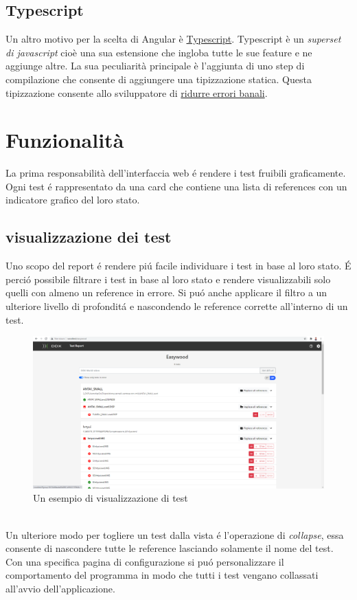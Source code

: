         \subsection{Typescript}
            Un altro motivo per la scelta di Angular è \href{https://www.typescriptlang.org}{Typescript}.
            Typescript è un \textit{superset di javascript} cioè una sua estensione che ingloba tutte le sue feature e ne aggiunge altre.
            La sua peculiarità principale è l'aggiunta di uno step di compilazione che consente di aggiungere una tipizzazione statica.
            Questa tipizzazione consente allo sviluppatore di
            \href{https://www.quora.com/Why-is-type-checking-important-in-programming-languages-and-how-should-one-choose-between-dynamically-and-statically-typed-languages}{ridurre errori banali}.
    \section{Funzionalità}
        La prima responsabilità dell'interfaccia web \'e rendere i test fruibili graficamente.
        Ogni test \'e rappresentato da una card che contiene una lista di references con un indicatore grafico del loro stato.
        \subsection{visualizzazione dei test}        
            Uno scopo del report \'e rendere pi\'u facile individuare i test in base al loro stato.
            \'E perci\'o possibile filtrare i test in base al loro stato e rendere visualizzabili solo quelli con almeno un reference in errore.
            Si pu\'o anche applicare il filtro a un ulteriore livello di profondit\'a e nascondendo le reference corrette all'interno di un test.
            \begin{figure}
                \includegraphics{images/page.png}
                \caption{Un esempio di visualizzazione di test}
            \end{figure}
            \\
            Un ulteriore modo per togliere un test dalla vista \'e l'operazione di \textit{collapse}, essa consente di nascondere tutte le reference lasciando solamente il nome del test.
            Con una specifica pagina di configurazione si pu\'o personalizzare il comportamento del programma in modo che tutti i test vengano collassati all'avvio dell'applicazione.
            
